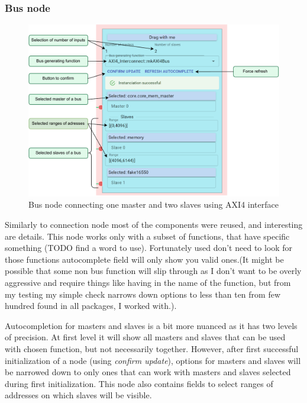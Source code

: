 \documentclass[12pt]{report}
\begin{document}
\subsubsection{Bus node}
\begin{figure}[!h]
    \centering
    
    \includegraphics[width=1\columnwidth]{pdfExports/LargeMap-BusNode.drawio.pdf}
    \caption{Bus node connecting one master and two slaves using AXI4 interface}
\end{figure}
Similarly to connection node most of the components were reused, and interesting are details. This node works only with a subset of functions, that have specific something (TODO find a word to use). Fortunately used don't need to look for those functions autocomplete field will only show you valid ones.(It might be possible that some non bus function will slip through as I don't want to be overly aggressive and require things like having  in the name of the function, but from my testing my simple check narrows down options to less than ten from few hundred found in all packages, I worked with.).  

Autocompletion for masters and slaves is a bit more nuanced as it has two levels of precision. At first level it will show all masters and slaves that can be used with chosen function, but not necessarily together. However, after first successful initialization of a node (using \emph{confirm update}), options for masters and slaves will be narrowed down to only ones that can work with masters and slaves selected during first initialization.
This node also contains fields to select ranges of addresses on which slaves will be visible. 
\newpage
\end{document}

